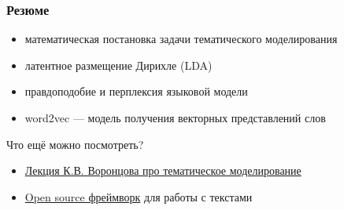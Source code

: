 \documentclass[fullscreen=true, bookmarks=true, hyperref={pdfencoding=unicode}]{beamer}
\begin{document}
\begin{frame}
  \frametitle{Резюме}

  \begin{itemize}
    \item математическая постановка задачи тематического моделирования
    \item латентное размещение Дирихле (LDA)
    \item правдоподобие и перплексия языковой модели
    \item word2vec — модель получения векторных представлений слов
  \end{itemize}
  \pause
  \vspace{1cm}
  Что ещё можно посмотреть?
  \begin{itemize}
    \item \href{https://youtu.be/Eqm8-YqUzAc}{Лекция К.В. Воронцова про тематическое моделирование}
    \item \href{https://deeppavlov.ai/}{Open source фреймворк} для работы с текстами
  \end{itemize}
\end{frame}
\end{document}

